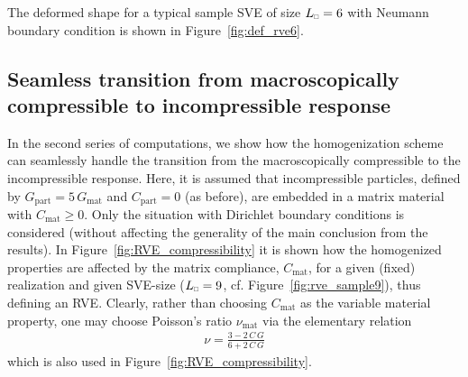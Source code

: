 \documentclass{bmcart}
\newcommand{\tikzsetnextfilename}[1]{}
\newcommand{\tikzinput}[1]{\texttt{[image: \#1]}}
\newcommand{\figref}[1]{Figure~\ref{#1}}
\renewcommand{\dev}{\mathrm{d}}
\newcommand{\rve}{
  {\mathchoice
   {\mbox{\scalebox{0.67}{$\Box$}}}
   {\mbox{\scalebox{0.67}{$\Box$}}}
   {\mbox{\scalebox{0.5}{$\Box$}}}
   {\mbox{\scalebox{0.375}{$\Box$}}}
  }
}
\begin{document}


The deformed shape for a typical sample SVE of size $L_\rve = 6$ with Neumann boundary condition is shown in \figref{fig:def_rve6}.




\subsection{Seamless transition from macroscopically compressible to incompressible response}
In the second series of computations, we show how the homogenization scheme can seamlessly handle the transition from the macroscopically compressible to the incompressible response.
Here, it is assumed that incompressible particles, defined by $G_\mathrm{part} = 5\,G_\mathrm{mat}$ and $C_\mathrm{part} = 0$ (as before), are embedded in a matrix material with $C_\mathrm{mat}\geq 0$.
Only the situation with Dirichlet boundary conditions is considered (without affecting the generality of the main conclusion from the results).
In \figref{fig:RVE_compressibility} it is shown how the homogenized properties are affected by the matrix compliance, $C_\mathrm{mat}$, for a given (fixed) realization and given SVE-size ($L_\rve = 9$, cf. \figref{fig:rve_sample9}),  thus defining an RVE.
Clearly, rather than choosing $C_\mathrm{mat}$ as the variable material property, one may choose Poisson's ratio $\nu_\mathrm{mat}$ via the elementary relation
\begin{align}
 \nu = \frac{3-2\,C\,G}{6 + 2\,C\,G}
\end{align}
which is also used in \figref{fig:RVE_compressibility}.

\end{document}
